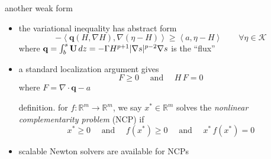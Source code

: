 \documentclass[hide notes,intlimits]{beamer}
\newcommand{\RR}{\mathbb{R}}
\newcommand{\Kcal}{\mathcal{K}}
\newcommand{\bq}{\mathbf{q}}
\newcommand{\Div}{\nabla\cdot}
\newcommand{\grad}{\nabla}
\newcommand{\ip}[2]{\ensuremath{\left<#1,#2\right>}}
\begin{document}
\begin{frame}{another weak form} 
\begin{itemize}
\item the variational inequality has abstract form
  $$- \ip{\bq(H,\grad H)}{\grad(\eta - H)} \ge \ip{a}{\eta-H} \qquad \forall \eta \in \Kcal$$
where $\bq=\int_b^s {\bf U}\, dz=-\Gamma H^{p+1} |\grad s|^{p-2} \grad s$ is the ``flux''
\item a standard localization argument gives
  $$F \ge 0 \quad \text{ and } \quad H\,F = 0$$
where $F = \Div \bq - a$
\begin{block}{definition.}
for $f:\RR^m \to \RR^m$, we say $x^* \in \RR^m$ solves the \emph{nonlinear complementarity problem} (NCP) if
  $$x^* \ge 0  \quad \text{ and } \quad f(x^*)\ge 0 \quad \text{ and } \quad x^*\,f(x^*)=0$$
\end{block}
\item scalable Newton solvers are available for NCPs
\end{itemize}
\end{frame}
\end{document}
